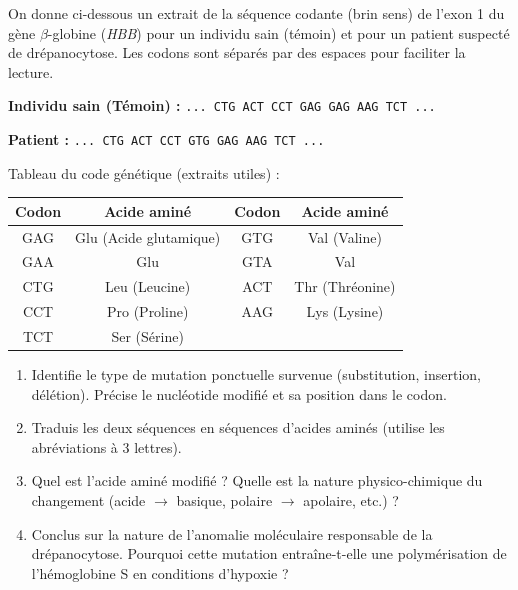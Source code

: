 \documentclass[11pt]{article}
\begin{document}
\begin{exercice}
On donne ci-dessous un extrait de la séquence codante (brin sens) de l'exon 1 du gène $\beta$-globine (\emph{HBB}) pour un individu sain (témoin) et pour un patient suspecté de drépanocytose. Les codons sont séparés par des espaces pour faciliter la lecture.

\textbf{Individu sain (Témoin) :}
\verb|... CTG ACT CCT GAG GAG AAG TCT ...|

\textbf{Patient :}
\verb|... CTG ACT CCT GTG GAG AAG TCT ...|

Tableau du code génétique (extraits utiles) :
\begin{center}
\begin{tabular}{|c|c|c|c|}\hline
Codon & Acide aminé & Codon & Acide aminé \\ \hline
GAG & Glu (Acide glutamique) & GTG & Val (Valine) \\
GAA & Glu & GTA & Val \\
CTG & Leu (Leucine) & ACT & Thr (Thréonine) \\
CCT & Pro (Proline) & AAG & Lys (Lysine) \\
TCT & Ser (Sérine) & & \\ \hline
\end{tabular}
\end{center}

\begin{enumerate}
    \item Identifie le type de mutation ponctuelle survenue (substitution, insertion, délétion). Précise le nucléotide modifié et sa position dans le codon.
    \item Traduis les deux séquences en séquences d'acides aminés (utilise les abréviations à 3 lettres).
    \item Quel est l'acide aminé modifié ? Quelle est la nature physico-chimique du changement (acide $\to$ basique, polaire $\to$ apolaire, etc.) ?
    \item Conclus sur la nature de l'anomalie moléculaire responsable de la drépanocytose. Pourquoi cette mutation entraîne-t-elle une polymérisation de l'hémoglobine S en conditions d'hypoxie ?
\end{enumerate}
\end{exercice}
\end{document}
